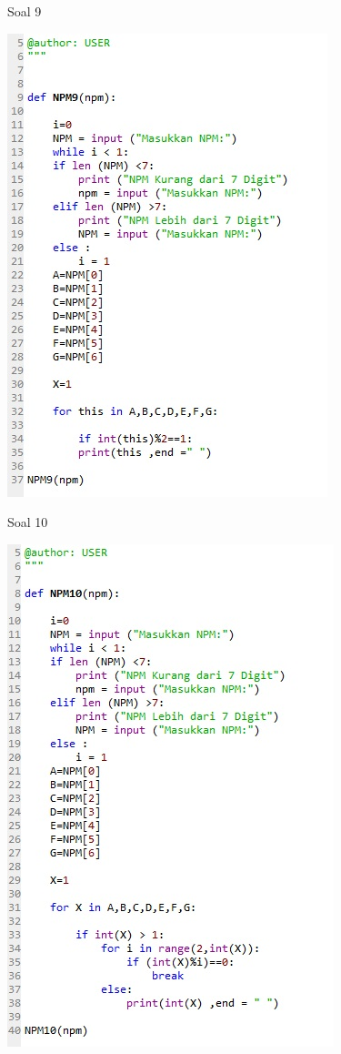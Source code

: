 \documentclass[a4paper,12pt]{report}
\begin{document}
\item Soal 9
    \begin{center}
    \includegraphics[width=11cm\textwidth]{Ketrampilan/9.jpg}
    \end{center}
\item Soal 10
    \begin{center}
    \includegraphics[width=11cm\textwidth]{Ketrampilan/10.jpg}
    \end{center}
\end{document}
